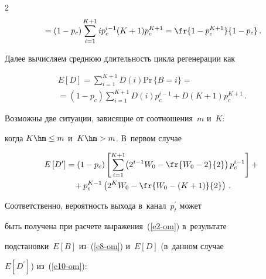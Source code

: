 \begin{multicols}{2}
\begin{multline}
    {}=\left(1-p_c\right) 


\sum\limits_{i=1}^{K+1} i p_c^{i-1} (K+1) p_c^{K+1} = \fr{1-


p_c^{K+1}}{1-p_c}\,.


    \label{e8-om}


    \end{multline}


    


    Далее вычисляем среднюю длительность цикла регенерации как


    \begin{multline*}


    E[D]= \sum\limits_{i=1}^{K+1} D(i) \mathrm{Pr}\,\{B=i\} = {}\\


    {}=\left(1-p_c\right) 


\sum\limits_{i=1}^{K+1} D(i) p_c^{i-1} +D(K+1) p_c^{K+1}\,.




    \end{multline*}


    


    Возможны две ситуации, зависящие от соотношения~$m$ и~$K$: 


когда $K\hm\leq m$ и~$K\hm>m$. В~первом случае


    \begin{multline}


    E\left[ D^\prime\right] = (1-p_c) \left[ \sum\limits_{i=1}^{K+1}\! \left( 


2^{i-1} W_0 -\fr{W_0-2}{2}\right) p_c^{i-1}\right] +{}\\


{}+


    p_c^{K-1} \left( 2^K W_0 -\fr{W_0-(K+1)}{2}\right)\,.


    \label{e10-om}


    \end{multline}


    


    Соответственно, вероятность выхода в~канал~$p^\prime_t$ может 


быть получена при расчете выражения~(\ref{e2-om}) в~результате 


подстановки~$E[B]$ из~(\ref{e8-om}) и~$E[D]$ (в~данном случае 


$E[D^\prime]$) из~(\ref{e10-om}):



\end{multicols}
